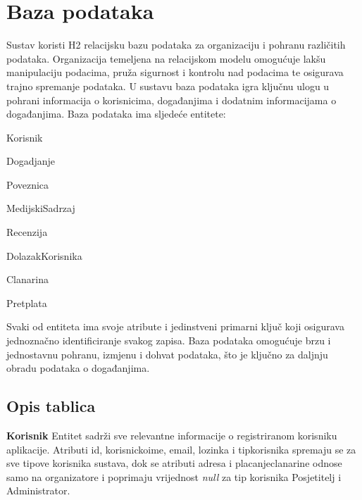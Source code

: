 		\newpage
		
		\section{Baza podataka}
			
		Sustav koristi H2 relacijsku bazu podataka za organizaciju i pohranu različitih podataka. Organizacija temeljena na relacijskom modelu omogućuje lakšu manipulaciju podacima, pruža sigurnost i kontrolu nad podacima te osigurava trajno spremanje podataka. U sustavu baza podataka igra ključnu ulogu u pohrani informacija o korisnicima, događanjima i dodatnim informacijama o događanjima. Baza podataka ima sljedeće entitete:
		
		\begin{packed_item}
			\item Korisnik
			\item Dogadjanje
			\item Poveznica
			\item MedijskiSadrzaj
			\item Recenzija
			\item DolazakKorisnika
			\item Clanarina
			\item Pretplata
		\end{packed_item}
		
		\noindent Svaki od entiteta ima svoje atribute i jedinstveni primarni ključ koji osigurava jednoznačno identificiranje svakog zapisa. Baza podataka omogućuje brzu i jednostavnu pohranu, izmjenu i dohvat podataka, što je ključno za daljnju obradu podataka o događanjima.
		
			\subsection{Opis tablica}
			
				\noindent \textbf{Korisnik} Entitet sadrži sve relevantne informacije o registriranom korisniku aplikacije. Atributi id, korisnickoime, email, lozinka i tipkorisnika spremaju se za sve tipove korisnika sustava, dok se atributi adresa i placanjeclanarine odnose samo na organizatore i poprimaju vrijednost \textit{null} za tip korisnika Posjetitelj i Administrator.
				
